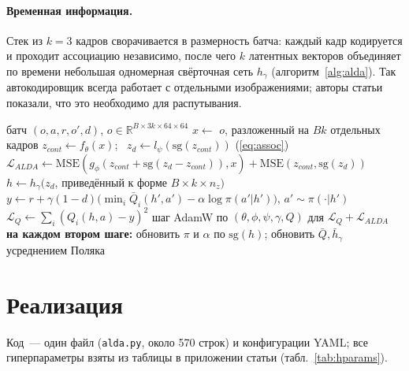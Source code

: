 \documentclass{article}
\theoremstyle{plain}
\theoremstyle{definition}
\theoremstyle{remark}
\begin{document}
\paragraph{Временная информация.} Стек из $k{=}3$ кадров сворачивается в
размерность батча: каждый кадр кодируется и проходит ассоциацию независимо,
после чего $k$ латентных векторов объединяет по времени небольшая одномерная
свёрточная сеть $h_\gamma$ (алгоритм~\ref{alg:alda}). Так автокодировщик всегда
работает с отдельными изображениями; авторы статьи показали, что это
необходимо для распутывания.

\begin{algorithm}[tb]
   \caption{Обновление SAC+ALDA (один шаг градиента)}
   \label{alg:alda}
\begin{algorithmic}
    батч $(o, a, r, o', d)$, $o\in\mathbb{R}^{B\times 3k\times64\times64}$
   \STATE $x \leftarrow$ $o$, разложенный на $Bk$ отдельных кадров
   \STATE $z_{cont} \leftarrow f_\theta(x)$; \ $z_d \leftarrow l_\psi(\mathrm{sg}(z_{cont}))$ \hfill (\ref{eq:assoc})
   \STATE $\mathcal{L}_{ALDA} \leftarrow \mathrm{MSE}(g_\phi(z_{cont}{+}\mathrm{sg}(z_d{-}z_{cont})), x) + \mathrm{MSE}(z_{cont}, \mathrm{sg}(z_d))$
   \STATE $h \leftarrow h_\gamma(z_d$, приведённый к форме $B\times k\times n_z)$
   \STATE $y \leftarrow r + \gamma(1{-}d)\big(\min_i \bar Q_i(h', a') - \alpha\log\pi(a'|h')\big)$, $a'\sim\pi(\cdot|h')$
   \STATE $\mathcal{L}_Q \leftarrow \sum_i (Q_i(h,a) - y)^2$
   \STATE шаг AdamW по $(\theta,\phi,\psi,\gamma,Q)$ для $\mathcal{L}_Q + \mathcal{L}_{ALDA}$
   \STATE \textbf{на каждом втором шаге:} обновить $\pi$ и $\alpha$ по $\mathrm{sg}(h)$; обновить $\bar Q, \bar h_\gamma$ усреднением Поляка
\end{algorithmic}
\end{algorithm}

\section{Реализация}
\label{sec:impl}

Код~--- один файл (\texttt{alda.py}, около 570 строк) и конфигурации YAML;
все гиперпараметры взяты из таблицы в приложении статьи
(табл.~\ref{tab:hparams}).
\end{document}
